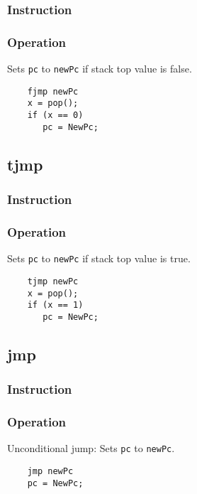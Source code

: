 \subsubsection{Instruction}

\subsubsection{Operation}
Sets \lstinline$pc$ to \lstinline$newPc$ if stack top value is false.

	\begin{lstlisting}
	fjmp newPc
	x = pop();
	if (x == 0)
	   pc = NewPc;
	\end{lstlisting}

\subsection{tjmp}
\subsubsection{Instruction}

\subsubsection{Operation}
Sets \lstinline$pc$ to \lstinline$newPc$ if stack top value is true.

	\begin{lstlisting}
	tjmp newPc
	x = pop();
	if (x == 1)
	   pc = NewPc;
	\end{lstlisting}

\subsection{jmp}
\subsubsection{Instruction}

\subsubsection{Operation}
Unconditional jump: Sets \lstinline$pc$ to \lstinline$newPc$.

	\begin{lstlisting}
	jmp newPc
	pc = NewPc;
	\end{lstlisting}

